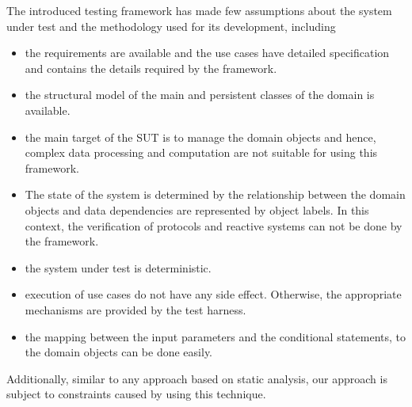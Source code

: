 %
%
\label{sec:discussion}
The introduced testing framework has made few assumptions about the system under test and the methodology used for its development, including

\begin{itemize}
	\item the requirements are available and the use cases have detailed specification and contains the details required by the framework.
	
	\item the structural model of the main and persistent classes of the domain is available.
	
	\item  the main target of the SUT is to manage the domain objects and hence, complex data processing and computation are not suitable for using this framework.
	
	\item The state of the system is determined by the relationship between the domain objects and data dependencies are represented by object labels. In this context, the verification of protocols and reactive systems can not be done by the framework. 
	
	\item the system under test is deterministic.
	
	\item execution of use cases do not have any side effect. Otherwise, the appropriate mechanisms are provided by the test harness.
	
	\item the mapping between the input parameters and the conditional statements, to the domain objects can be done easily.
	
\end{itemize}

Additionally, similar to any approach based on static analysis, our approach is subject to constraints caused by using this technique. 